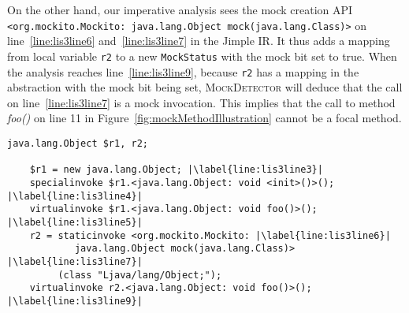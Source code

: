 On the other hand, our imperative analysis sees the mock creation API \texttt{<org.mockito.Mockito: java.lang.Object mock(java.lang.Class)>} on line~\ref{line:lis3line6} and~\ref{line:lis3line7} in the Jimple IR. It thus adds a mapping from local variable \texttt{r2} to a new \texttt{MockStatus} with the mock bit set to true. When the analysis reaches line~\ref{line:lis3line9}, because \texttt{r2} has a mapping in the abstraction with the mock bit being set, \textsc{MockDetector} will deduce that the call on line~\ref{line:lis3line7} is a mock invocation. This implies that the call to method \textit{foo()} on line 11 in Figure~\ref{fig:mockMethodIllustration} cannot be a focal method.


\begin{lstlisting}[basicstyle=\ttfamily, caption={Jimple Intermediate Representation for the code in Figure~\ref{fig:mockMethodIllustration}.},
basicstyle=\scriptsize\ttfamily, captionpos=b, label=lis:mockMethodIllustrationIR, escapechar=|, morekeywords={@Test, specialinvoke, virtualinvoke, staticinvoke}]
	java.lang.Object $r1, r2;
	
	$r1 = new java.lang.Object; |\label{line:lis3line3}|
	specialinvoke $r1.<java.lang.Object: void <init>()>(); |\label{line:lis3line4}|
	virtualinvoke $r1.<java.lang.Object: void foo()>(); |\label{line:lis3line5}|
	r2 = staticinvoke <org.mockito.Mockito: |\label{line:lis3line6}|
	        java.lang.Object mock(java.lang.Class)> |\label{line:lis3line7}|
	     (class "Ljava/lang/Object;");
	virtualinvoke r2.<java.lang.Object: void foo()>(); |\label{line:lis3line9}|
\end{lstlisting}

